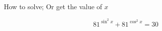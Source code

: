 \documentclass[12pt, a5paper]{article}
\begin{document}
How to solve; Or get the value of $x$

$$
81^{\sin^2 x} + 81^{\cos^2 x} = 30
$$
\end{document}
